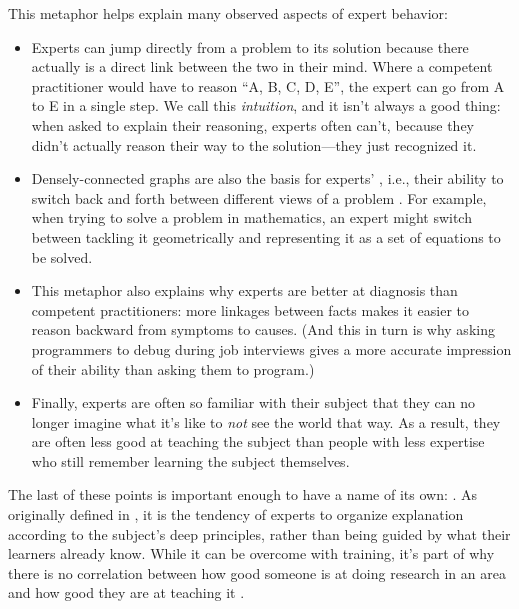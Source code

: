 This metaphor helps explain many observed aspects of expert behavior:

\begin{itemize}

\item
  Experts can jump directly from a problem to its solution because there
  actually is a direct link between the two in their mind. Where a
  competent practitioner would have to reason ``A, B, C, D, E'', the
  expert can go from A to E in a single step. We call this
  \emph{intuition}, and it isn't always a good thing: when asked to
  explain their reasoning, experts often can't, because they didn't
  actually reason their way to the solution---they just recognized it.

\item
  Densely-connected graphs are also the basis for experts'
  , i.e.,
  their ability to switch back and forth between different views of a
  problem \cite{Petr2016}. For example, when trying to solve a problem
  in mathematics, an expert might switch between tackling it
  geometrically and representing it as a set of equations to be
  solved.

\item
  This metaphor also explains why experts are better at diagnosis than
  competent practitioners: more linkages between facts makes it easier
  to reason backward from symptoms to causes. (And this in turn is why
  asking programmers to debug during job interviews gives a more
  accurate impression of their ability than asking them to program.)

\item
  Finally, experts are often so familiar with their subject that they
  can no longer imagine what it's like to \emph{not} see the world
  that way. As a result, they are often less good at teaching the
  subject than people with less expertise who still remember learning
  the subject themselves.

\end{itemize}

The last of these points is important enough to have a name of its
own: .  As originally
defined in \cite{Nath2003}, it is the tendency of experts to organize
explanation according to the subject's deep principles, rather than
being guided by what their learners already know.  While it can be
overcome with training, it's part of why there is no correlation
between how good someone is at doing research in an area and how good
they are at teaching it \cite{Mars2002}.

